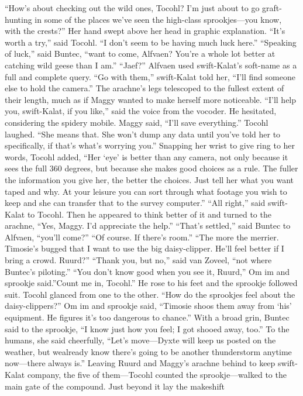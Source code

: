 \documentclass[9pt]{article}
\begin{document}
“How’s about checking out the wild ones, Tocohl? I’m just about to go graft-hunting in some of the
places we’ve seen the high-class sprookjes—you know, with the crests?” Her hand swept above her
head in graphic explanation.
“It’s worth a try,” said Tocohl. “I don’t seem to be having much luck here.”
“Speaking of luck,” said Buntec, “want to come, Alfvaen? You’re a whole lot better at catching wild
geese than I am.”
“Jaef?” Alfvaen used swift-Kalat’s soft-name as a full and complete query.
“Go with them,” swift-Kalat told her, “I’ll find someone else to hold the camera.”
The arachne’s legs telescoped to the fullest extent of their length, much as if Maggy wanted to make
herself more noticeable. “I’ll help you, swift-Kalat, if you like,” said the voice from the vocoder.
He hesitated, considering the spidery mobile.
Maggy said, “I’ll save everything.”
Tocohl laughed. “She means that. She won’t dump any data until you’ve told her to specifically, if
that’s what’s worrying you.” Snapping her wrist to give ring to her words, Tocohl added, “Her ‘eye’ is
better than any camera, not only because it sees the full 360 degrees, but because she makes good
choices as a rule. The fuller the information you give her, the better the choices. Just tell her what you
want taped and why. At your leisure you can sort through what footage you wish to keep and she can
transfer that to the survey computer.”
“All right,” said swift-Kalat to Tocohl. Then he appeared to think better of it and turned to the
arachne, “Yes, Maggy. I’d appreciate the help.”
“That’s settled,” said Buntec to Alfvaen, “you’ll come?”
“Of course. If there’s room.”
“The more the merrier. Timosie’s bugged that I want to use the big daisy-clipper. He’ll feel better if I
bring a crowd. Ruurd?”
“Thank you, but no,” said van Zoveel, “not where Buntec’s piloting.”
“You don’t know good when you see it, Ruurd,” Om im and sprookje said.”Count me in, Tocohl.”
He rose to his feet and the sprookje followed suit.
Tocohl glanced from one to the other. “How do the sprookjes feel about the daisy-clippers?”
Om im and sprookje said, “Timosie shoos them away from ‘his’ equipment. He figures it’s too
dangerous to chance.”
With a broad grin, Buntec said to the sprookje, “I know just how you feel; I got shooed away, too.”
To the humans, she said cheerfully, “Let’s move—Dyxte will keep us posted on the weather, but wealready know there’s going to be another thunderstorm anytime now—there always is.”
Leaving Ruurd and Maggy’s arachne behind to keep swift-Kalat company, the five of them—Tocohl
counted the sprookje—walked to the main gate of the compound. Just beyond it lay the makeshift
\end{document}
